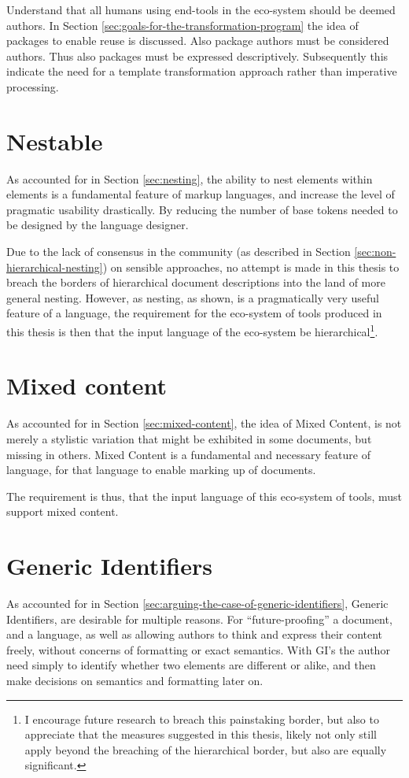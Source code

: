 \documentclass{scrreprt}
\begin{document}
Understand that all humans using end-tools in the eco-system should be deemed authors. In Section \ref{sec:goals-for-the-transformation-program} the idea of packages to enable reuse is discussed. Also package authors must be considered authors. Thus also packages must be expressed descriptively. Subsequently this indicate the need for a template transformation approach rather than imperative processing.



\section{Nestable}
As accounted for in Section \ref{sec:nesting}, the ability to nest elements within elements is a fundamental feature of markup languages, and increase the level of pragmatic usability drastically. By reducing the number of base tokens needed to be designed by the language designer.

Due to the lack of consensus in the community (as described in Section \ref{sec:non-hierarchical-nesting}) on sensible approaches, no attempt is made in this thesis to breach the borders of hierarchical document descriptions into the land of more general nesting. However, as nesting, as shown, is a pragmatically very useful feature of a language, the requirement for the eco-system of tools produced in this thesis is then that the input language of the eco-system be hierarchical\footnote{I encourage future research to breach this painstaking border, but also to appreciate that the measures suggested in this thesis, likely not only still apply beyond the breaching of the hierarchical border, but also are equally significant.}.



\section{Mixed content}
As accounted for in Section \ref{sec:mixed-content}, the idea of Mixed Content, is not merely a stylistic variation that might be exhibited in some documents, but missing in others. Mixed Content is a fundamental and necessary feature of language, for that language to enable marking up of documents.

The requirement is thus, that the input language of this eco-system of tools, must support mixed content.



\section{Generic Identifiers}
As accounted for in Section \ref{sec:arguing-the-case-of-generic-identifiers}, Generic Identifiers, are desirable for multiple reasons. For ``future-proofing'' a document, and a language, as well as allowing authors to think and express their content freely, without concerns of formatting or exact semantics. With GI's the author need simply to identify whether two elements are different or alike, and then make decisions on semantics and formatting later on.
\end{document}
